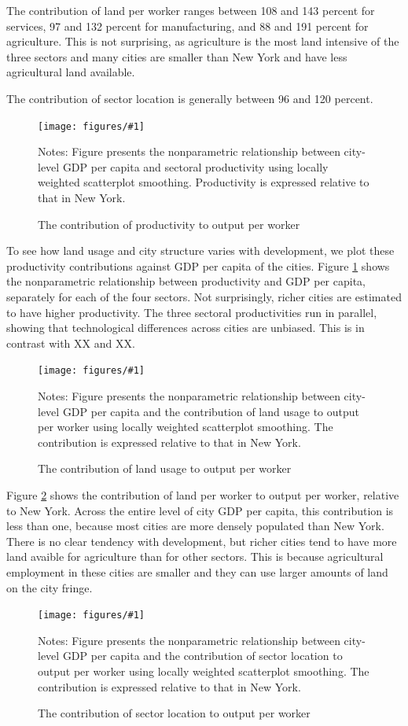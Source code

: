 \documentclass[12pt]{article}
\newcommand{\dofigure}[3]{\begin{figure}
\begin{centering}
\texttt{[image: figures/\#1]}
  \caption{#2\label{fig:#1}}
\end{centering}

\noindent \footnotesize{#3}
\end{figure}}
\begin{document}
The contribution of land per worker ranges between 108 and 143 percent for services, 97 and 132 percent for manufacturing, and 88 and 191 percent for agriculture. This is not surprising, as agriculture is the most land intensive of the three sectors and many cities are smaller than New York and have less agricultural land available.

The contribution of sector location is generally between 96 and 120 percent.

\dofigure{city_level_inputs/productivity}{The contribution of productivity to output per worker}{Notes: Figure presents the nonparametric relationship between city-level GDP per capita and sectoral productivity using locally weighted scatterplot smoothing. Productivity is expressed relative to that in New York.}

To see how land usage and city structure varies with development, we plot these productivity contributions against GDP per capita of the cities. Figure \ref{fig:city_level_inputs/productivity} shows the nonparametric relationship between productivity and GDP per capita, separately for each of the four sectors. Not surprisingly, richer cities are estimated to have higher productivity. The three sectoral productivities run in parallel, showing that technological differences across cities are unbiased. This is in contrast with XX and XX.

\dofigure{city_level_inputs/land}{The contribution of land usage to output per worker}{Notes: Figure presents the nonparametric relationship between city-level GDP per capita and the contribution of land usage to output per worker using locally weighted scatterplot smoothing. The contribution is expressed relative to that in New York.}

Figure \ref{fig:city_level_inputs/land} shows the contribution of land per worker to output per worker, relative to New York. Across the entire level of city GDP per capita, this contribution is less than one, because most cities are more densely populated than New York. There is no clear tendency with development, but richer cities tend to have more land avaible for agriculture than for other sectors. This is because agricultural employment in these cities are smaller and they can use larger amounts of land on the city fringe.

\dofigure{city_level_inputs/location}{The contribution of sector location to output per worker}{Notes: Figure presents the nonparametric relationship between city-level GDP per capita and the contribution of sector location to output per worker using locally weighted scatterplot smoothing. The contribution is expressed relative to that in New York.}
\end{document}
